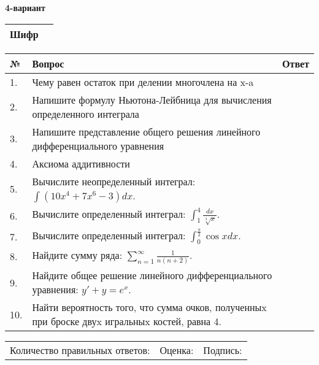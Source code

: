 \documentclass{article}
\begin{document}
  \egroup
  
  \newpage
  
  
  \textbf{4-вариант}\\
  
  \bgroup
  \def\arraystretch{1.6} %
  
  \begin{tabular}{|m{5.7cm}|m{9.5cm}|}
  \hline
  Шифр & \\
  \hline
  \end{tabular}
  
  \vspace{1cm}
  
  \begin{tabular}{|m{0.7cm}|m{10cm}|m{4cm}|}
  \hline
  № & Вопрос & Ответ \\
  \hline
  1. & Чему равен остаток при делении многочлена на x-a &  \\
  \hline
  2. & Напишите формулу Ньютона-Лейбница для вычисления определенного интеграла &  \\
  \hline
  3. & Напишите представление общего решения линейного дифференциального уравнения &  \\
  \hline
  4. & Аксиома аддитивности &  \\
  \hline
  5. & Вычислите неопределенный интеграл: \(\int{\left( 10x^{4} + 7x^{6} - 3 \right)dx}\). &  \\
  \hline
  6. & Вычислите определенный интеграл: \(\int_{1}^{4}\frac{dx}{\sqrt[3]{x}}\). &  \\
  \hline
  7. & Вычислите определенный интеграл: \(\int_{0}^{\frac{\pi}{2}}{\cos xdx}\). &  \\
  \hline
  8. & Найдите сумму ряда: \(\sum_{n = 1}^{\infty}\frac{1}{n(n + 2)}\). &  \\
  \hline
  9. & Найдите общее решение линейного дифференциального уравнения: \(y' + y = e^{x}\). &  \\
  \hline
  10. & Найти вероятность того, что сумма очков, полученныx при броске двуx игральныx костей, равна 4. &  \\
  \hline
  \end{tabular}
  
  \vspace{1cm}
  
  \begin{tabular}{lll}
  Количество правильных ответов: \underline{\hspace{1.5cm}} & 
  Оценка: \underline{\hspace{1.5cm}} & 
  Подпись: \underline{\hspace{2cm}} \\
  \end{tabular}
  
\end{document}
